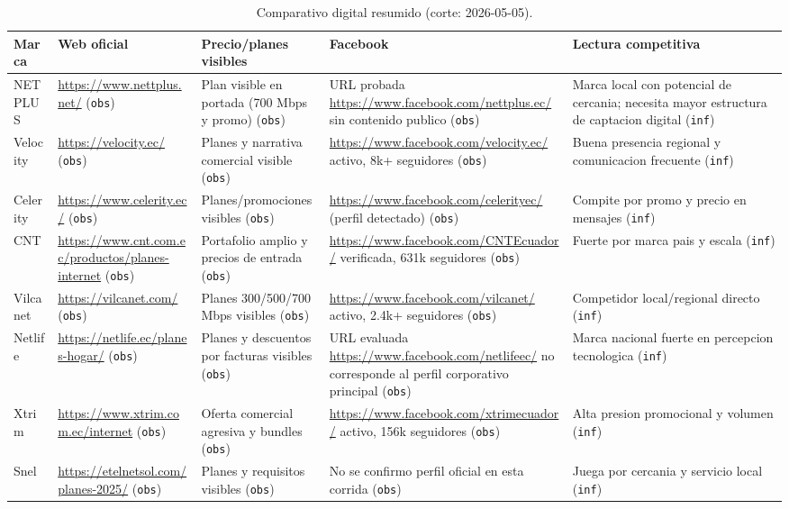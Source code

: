 \documentclass[9pt,a4paper,twocolumn,twoside]{tau-class/tau}
\begin{document}
\begin{table}[t]
  \centering
  \small
  \begin{tabular}{@{}p{2.3cm}p{2.9cm}p{2.8cm}p{2.8cm}p{2.8cm}@{}}
    \toprule
    \textbf{Marca} & \textbf{Web oficial} & \textbf{Precio/planes visibles} & \textbf{Facebook} & \textbf{Lectura competitiva} \\
    \midrule
    NETPLUS & \url{https://www.nettplus.net/} (\texttt{obs}) & Plan visible en portada (700 Mbps y promo) (\texttt{obs}) & URL probada \url{https://www.facebook.com/nettplus.ec/} sin contenido publico (\texttt{obs}) & Marca local con potencial de cercania; necesita mayor estructura de captacion digital (\texttt{inf}) \\
    Velocity & \url{https://velocity.ec/} (\texttt{obs}) & Planes y narrativa comercial visible (\texttt{obs}) & \url{https://www.facebook.com/velocity.ec/} activo, 8k+ seguidores (\texttt{obs}) & Buena presencia regional y comunicacion frecuente (\texttt{inf}) \\
    Celerity & \url{https://www.celerity.ec/} (\texttt{obs}) & Planes/promociones visibles (\texttt{obs}) & \url{https://www.facebook.com/celerityec/} (perfil detectado) (\texttt{obs}) & Compite por promo y precio en mensajes (\texttt{inf}) \\
    CNT & \url{https://www.cnt.com.ec/productos/planes-internet} (\texttt{obs}) & Portafolio amplio y precios de entrada (\texttt{obs}) & \url{https://www.facebook.com/CNTEcuador/} verificada, 631k seguidores (\texttt{obs}) & Fuerte por marca pais y escala (\texttt{inf}) \\
    Vilcanet & \url{https://vilcanet.com/} (\texttt{obs}) & Planes 300/500/700 Mbps visibles (\texttt{obs}) & \url{https://www.facebook.com/vilcanet/} activo, 2.4k+ seguidores (\texttt{obs}) & Competidor local/regional directo (\texttt{inf}) \\
    Netlife & \url{https://netlife.ec/planes-hogar/} (\texttt{obs}) & Planes y descuentos por facturas visibles (\texttt{obs}) & URL evaluada \url{https://www.facebook.com/netlifeec/} no corresponde al perfil corporativo principal (\texttt{obs}) & Marca nacional fuerte en percepcion tecnologica (\texttt{inf}) \\
    Xtrim & \url{https://www.xtrim.com.ec/internet} (\texttt{obs}) & Oferta comercial agresiva y bundles (\texttt{obs}) & \url{https://www.facebook.com/xtrimecuador/} activo, 156k seguidores (\texttt{obs}) & Alta presion promocional y volumen (\texttt{inf}) \\
    Snel & \url{https://etelnetsol.com/planes-2025/} (\texttt{obs}) & Planes y requisitos visibles (\texttt{obs}) & No se confirmo perfil oficial en esta corrida (\texttt{obs}) & Juega por cercania y servicio local (\texttt{inf}) \\
    \bottomrule
  \end{tabular}
  \caption{Comparativo digital resumido (corte: 2026-05-05).}
\end{table}
\end{document}
